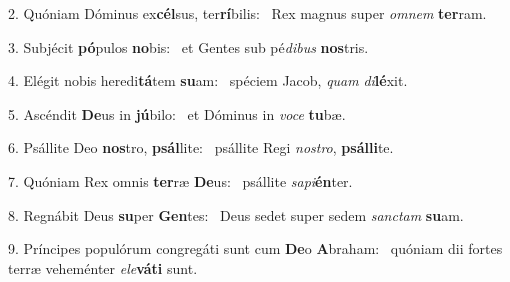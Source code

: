 2. Quóniam Dóminus ex\textbf{cél}sus, ter\textbf{rí}bilis: \ast\  Rex magnus super \textit{om}\textit{nem} \textbf{ter}ram.\

3. Subjécit \textbf{pó}pulos \textbf{no}bis: \ast\  et Gentes sub pé\textit{di}\textit{bus} \textbf{nos}tris.\

4. Elégit nobis heredi\textbf{tá}tem \textbf{su}am: \ast\  spéciem Jacob, \textit{quam} \textit{di}\textbf{lé}xit.\

5. Ascéndit \textbf{De}us in \textbf{jú}bilo: \ast\  et Dóminus in \textit{vo}\textit{ce} \textbf{tu}bæ.\

6. Psállite Deo \textbf{nos}tro, \textbf{psál}lite: \ast\  psállite Regi \textit{nos}\textit{tro}, \textbf{psál}\textbf{li}te.\

7. Quóniam Rex omnis \textbf{ter}ræ \textbf{De}us: \ast\  psállite \textit{sa}\textit{pi}\textbf{én}ter.\

8. Regnábit Deus \textbf{su}per \textbf{Gen}tes: \ast\  Deus sedet super sedem \textit{sanc}\textit{tam} \textbf{su}am.\

9. Príncipes populórum congregáti sunt cum \textbf{De}o \textbf{A}braham: \ast\  quóniam dii fortes terræ veheménter \textit{e}\textit{le}\textbf{vá}\textbf{ti} sunt.\

